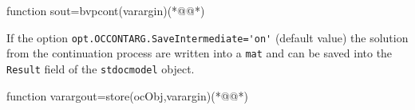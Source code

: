 \begin{matlab}
function sout=bvpcont(varargin)(*@@*)
%
%
%
%
%
%
\end{matlab}
If the option \lstinline+opt.OCCONTARG.SaveIntermediate='on'+ (default value) the solution from the continuation process are written into a \lstinline+mat+ and can be saved into the \lstinline+Result+ field of the \lstinline+stdocmodel+ object.
\begin{matlab}
function varargout=store(ocObj,varargin)(*@@*)
%
%
%
%
%
\end{matlab}
